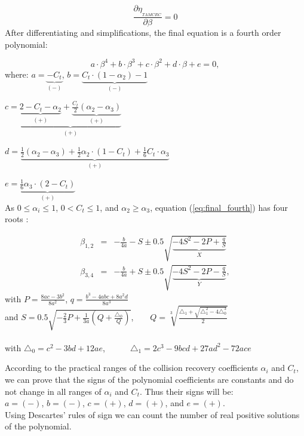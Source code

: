 \documentclass[10pt,conference,letterpaper]{RWWTemplate}
\begin{document}
{\scriptsize{}
\begin{equation}
\frac{\partial\eta_{_{TAMCRC}}}{\partial\beta}=0\label{eq:diff}
\end{equation}
}After differentiating and simplifications, the final equation is
a fourth order polynomial:

{\footnotesize{}
\begin{equation}
a\cdot\beta^{4}+b\cdot\beta^{3}+c\cdot\beta^{2}+d\cdot\beta+e=0,\label{eq:final_fourth}
\end{equation}
}where: {\scriptsize{}$a=\underset{(-)}{\underbrace{-C_{t}}}$, $b=\underset{(-)}{\underbrace{C_{t}\cdot(1-\alpha_{2})-1}}$}{\scriptsize \par}

{\scriptsize{}$c=\underset{(+)}{\underbrace{\underset{(+)}{\underbrace{2-C_{t}-\alpha_{2}}}+\underset{(+)}{\underbrace{\frac{C_{t}}{2}(\alpha_{2}-\alpha_{3})}}}}$}{\scriptsize \par}

{\scriptsize{}$d=\underset{(+)}{\underbrace{\frac{1}{2}(\alpha_{2}-\alpha_{3})+\frac{1}{2}\alpha_{2}\cdot(1-C_{t})+\frac{1}{6}C_{t}\cdot\alpha_{3}}}$}{\scriptsize \par}

{\scriptsize{}$e=\underset{(+)}{\underbrace{\frac{1}{6}\alpha_{3}\cdot(2-C_{t})}}$}\\
As $0\leq\alpha_{i}\leq1$, $0<C_{t}\leq1$, and $\alpha_{2}\geq\alpha_{3}$,
equation (\ref{eq:final_fourth}) has four roots \cite{Math_book_quartic}:

{\scriptsize{}
\begin{eqnarray}
\beta_{1,2} & = & -\frac{b}{4a}-S\pm0.5\sqrt{\underset{X}{\underbrace{-4S^{2}-2P+\frac{q}{S}}}}\label{eq:roots}\\
\beta_{3,4} & = & -\frac{b}{4a}+S\pm0.5\sqrt{\underset{Y}{\underbrace{-4S^{2}-2P-\frac{q}{S}}}},\nonumber 
\end{eqnarray}
}with $P=\frac{8ac-3b^{2}}{8a^{2}}$, $q=\frac{b^{3}-4abc+8a^{2}d}{8a^{3}}$\\
and{\scriptsize{} $S=0.5\sqrt{-\frac{2}{3}P+\frac{1}{3a}\left(Q+\frac{\triangle_{0}}{Q}\right)}$,~~~~$Q=\sqrt[3]{\frac{\triangle_{1}+\sqrt{\triangle_{1}^{2}-4\triangle_{0}^{3}}}{2}}$}\\
\\
with{\scriptsize{} $\triangle_{0}=c^{2}-3bd+12ae$,~~~~~~$\triangle_{1}=2c^{3}-9bcd+27ad^{2}-72ace$}{\scriptsize \par}

According to the practical ranges of the collision recovery coefficients
$\alpha_{i}$ and $C_{t}$, we can prove that the signs of the polynomial
coefficients are constants and do not change in all ranges of $\alpha_{i}$
and $C_{t}.$ Thus their signs will be: \\
$a=(-)$, $b=(-)$, $c=(+)$, $d=(+)$, and $e=(+)$.\\
Using Descartes\textquoteright{} rules of sign \cite{Descartes_rule}
we can count the number of real positive solutions of the polynomial.
\end{document}
